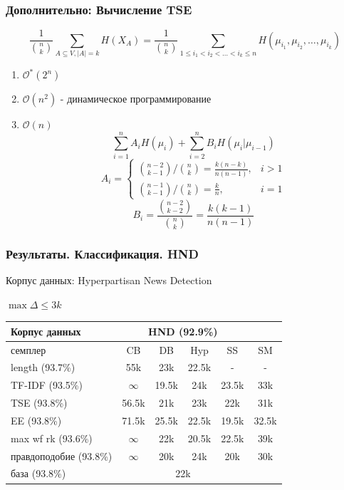 \documentclass{beamer}
\begin{document}
\begin{frame}[label=supplemental,noframenumbering]
	\frametitle{Дополнительно: Вычисление TSE}
	\[
	\frac{1}{\binom{n}{k}}\sum\limits_{A\subseteq V,|A|=k}H(X_A) =
	\frac{1}{\binom{n}{k}}\sum\limits_{1 \le i_1 < i_2 < \ldots < i_k \le n}H(\mu_{i_1}, \mu_{i_2}, \ldots, \mu_{i_k})
	\]
	\begin{enumerate}
		\item $\mathcal{O^*}(2^n)$
		\item $\mathcal{O}(n^2)$ - динамическое программирование
		\item $\mathcal{O}(n)$
		\[
		\sum\limits_{i=1}^{n}A_iH(\mu_i) + \sum\limits_{i=2}^{n}B_iH(\mu_i|\mu_{i-1})
		\]
		\[
		A_i = 
		\begin{cases}
		\binom{n-2}{k-1}/\binom{n}{k}=\frac{k(n-k)}{n(n-1)},& i > 1 \\
		\binom{n-1}{k-1}/\binom{n}{k}=\frac k n,& i = 1
		\end{cases}
		\]
		\[
		B_i = \frac{\binom{n-2}{k-2}}{\binom{n}{k}} = \frac{k(k-1)}{n(n-1)}
		\]
	\end{enumerate}
\end{frame}

\begin{frame}[label=supplemental,noframenumbering]
	\frametitle{Результаты. Классификация. HND}
	
	Корпус данных: Hyperpartisan News Detection
	
	$\max\Delta \le 3k$
	\begin{table}
		\begin{tabular}{l|ccccc}
			Корпус данных & \multicolumn{4}{c}{HND (92.9\%)}\\
			\hline
			семплер & CB & DB & Hyp & SS & SM\\
			\hline
			length (93.7\%) & 55k & 23k & 22.5k & - & -\\
			TF-IDF (93.5\%) & $\infty$ & 19.5k & 24k & 23.5k & 33k\\
			TSE (93.8\%) & 56.5k & 21k & 23k & 22k & 31k\\
			EE (93.8\%) & 71.5k & 25.5k & 22.5k & 19.5k & 32.5k\\
			max wf rk (93.6\%) & $\infty$ & 22k & 20.5k & 22.5k & 39k\\
			правдоподобие (93.8\%) & $\infty$ & 20k & 24k & 20k & 30k\\
			\hline
			база (93.8\%) & \multicolumn{4}{c}{22k}
		\end{tabular}
	\end{table}
\end{frame}
\end{document}
